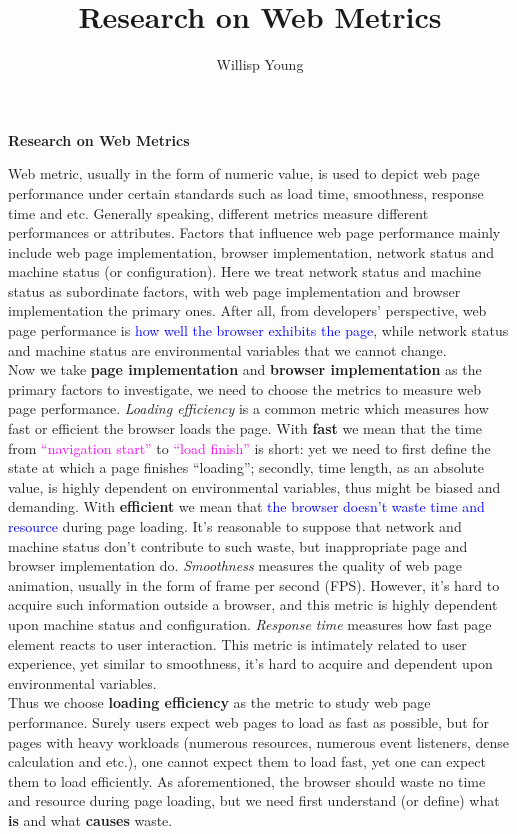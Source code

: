 \documentclass{article}
\title{Research on Web Metrics}
\author{Willisp Young}
\begin{document}
\centerline{\textbf{Research on Web Metrics}} 

Web metric, usually in the form of numeric value, is used to depict web page performance under certain standards such as load time, smoothness, response time and etc. Generally speaking, different metrics measure different performances or attributes. Factors that influence web page performance mainly include web page implementation, browser implementation, network status and machine status (or configuration). Here we treat network status and machine status as subordinate factors, with web page implementation and browser implementation the primary ones. After all, from developers' perspective, web page performance is \textcolor{blue}{how well the browser exhibits the page}, while network status and machine status are environmental variables that we cannot change. \\

Now we take \textbf{page implementation} and \textbf{browser implementation} as the primary factors to investigate, we need to choose the metrics to measure web page performance. \emph{Loading efficiency} is a common metric which measures how fast or efficient the browser loads the page. With \textbf{fast} we mean that the time from \textcolor{magenta}{``navigation start''} to \textcolor{magenta}{``load finish''} is short: yet we need to first define the state at which a page finishes ``loading''; secondly, time length, as an absolute value, is highly dependent on environmental variables, thus might be biased and demanding. With \textbf{efficient} we mean that \textcolor{blue}{the browser doesn't waste time and resource} during page loading. It's reasonable to suppose that network and machine status don't contribute to such waste, but inappropriate page and browser implementation do. \emph{Smoothness} measures the quality of web page animation, usually in the form of frame per second (FPS). However, it's hard to acquire such information outside a browser, and this metric is highly dependent upon machine status and configuration. \emph{Response time} measures how fast page element reacts to user interaction. This metric is intimately related to user experience, yet similar to smoothness, it's hard to acquire and dependent upon environmental variables. \\

Thus we choose \textbf{loading efficiency} as the metric to study web page performance. Surely users expect web pages to load as fast as possible, but for pages with heavy workloads (numerous resources, numerous event listeners, dense calculation and etc.), one cannot expect them to load fast, yet one can expect them to load efficiently. As aforementioned, the browser should waste no time and resource during page loading, but we need first understand (or define) what \textbf{is} and what \textbf{causes} waste. \\
\end{document}
